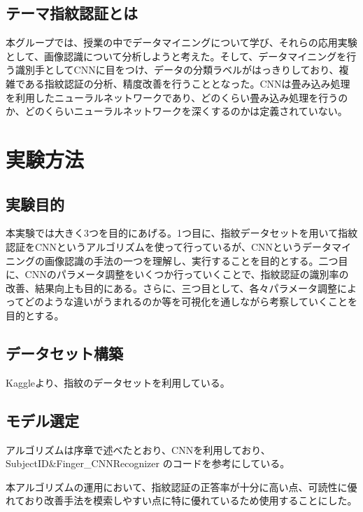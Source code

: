 \documentclass[a4paper, 11pt, titlepage]{jsarticle}
\begin{document}
\subsection{テーマ指紋認証とは}
本グループでは、授業の中でデータマイニングについて学び、それらの応用実験として、画像認識について分析しようと考えた。そして、データマイニングを行う識別手としてCNNに目をつけ、データの分類ラベルがはっきりしており、複雑である指紋認証の分析、精度改善を行うこととなった。CNNは畳み込み処理を利用したニューラルネットワークであり、どのくらい畳み込み処理を行うのか、どのくらいニューラルネットワークを深くするのかは定義されていない。


\section{実験方法}


\subsection{実験目的}
本実験では大きく3つを目的にあげる。1つ目に、指紋データセットを用いて指紋認証をCNNというアルゴリズムを使って行っているが、CNNというデータマイニングの画像認識の手法の一つを理解し、実行することを目的とする。二つ目に、CNNのパラメータ調整をいくつか行っていくことで、指紋認証の識別率の改善、結果向上も目的にある。さらに、三つ目として、各々パラメータ調整によってどのような違いがうまれるのか等を可視化を通しながら考察していくことを目的とする。


\subsection{データセット構築}
Kaggleより、指紋のデータセット\cite{cnn}を利用している。

\subsection{モデル選定}
アルゴリズムは序章で述べたとおり、CNNを利用しており、SubjectID\&Finger\_CNNRecognizer
\cite{algorithm}のコードを参考にしている。

本アルゴリズムの運用において、指紋認証の正答率が十分に高い点、可読性に優れており改善手法を模索しやすい点に特に優れているため使用することにした。

\clearpage
\end{document}
